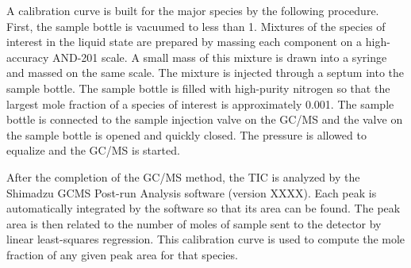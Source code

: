 \documentclass[../main.tex]{subfiles}
\begin{document}
A calibration curve is built for the major species by the
following procedure. First, the sample bottle is vacuumed
to less than \SI{1}{\torr}. Mixtures of the species of
interest in the liquid state are prepared by massing each
component on a high-accuracy AND-201 scale. A small mass
of this mixture is drawn into a syringe and massed on the
same scale. The mixture is injected through a septum into
the sample bottle. The sample bottle is filled with
high-purity nitrogen so that the largest mole fraction of
a species of interest is approximately 0.001. The sample
bottle is connected to the sample injection valve on the
GC/MS and the valve on the sample bottle is opened and
quickly closed. The pressure is allowed to equalize and
the GC/MS is started.

After the completion of the GC/MS method, the TIC is analyzed by the 
Shimadzu GCMS Post-run Analysis software (version XXXX). Each peak is 
automatically integrated by the software so that its area can be found.
The peak area is then related to the number of moles of
sample sent to the detector by linear least-squares regression.
This calibration curve is used to compute the mole fraction
of any given peak area for that species.
\end{document}
